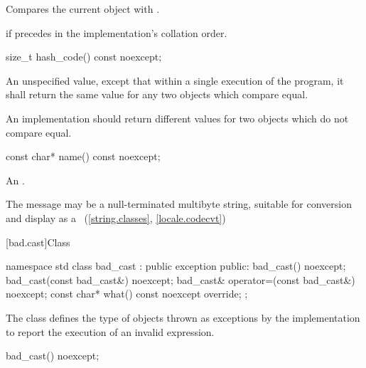 \begin{itemdescr}
\pnum
\effects
Compares the current object with .

\pnum
\returns
{}
if
precedes  in the implementation's collation order.
\end{itemdescr}

%
\begin{itemdecl}
size_t hash_code() const noexcept;
\end{itemdecl}

\begin{itemdescr}
\pnum
\returns An unspecified value, except that within a single execution of the
program, it shall return the same value for any two 
objects which compare equal.

\pnum
\remarks An implementation should return different values for two
 objects which do not compare equal.
\end{itemdescr}


%
\begin{itemdecl}
const char* name() const noexcept;
\end{itemdecl}

\begin{itemdescr}
\pnum
\returns
An  \ntbs{}.

\pnum
\remarks
The message may be a null-terminated multibyte string,
suitable for conversion and display as a
~(\ref{string.classes}, \ref{locale.codecvt})
\end{itemdescr}

[bad.cast]{Class }

%
\begin{codeblock}
namespace std {
  class bad_cast : public exception {
  public:
    bad_cast() noexcept;
    bad_cast(const bad_cast&) noexcept;
    bad_cast& operator=(const bad_cast&) noexcept;
    const char* what() const noexcept override;
  };
}
\end{codeblock}

\pnum
The class
defines the type of objects thrown
as exceptions by the implementation to report the execution of an invalid
%
expression.

%
\begin{itemdecl}
bad_cast() noexcept;
\end{itemdecl}

